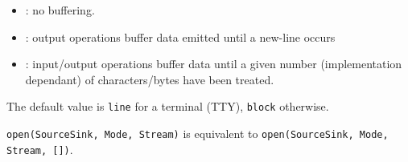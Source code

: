\begin{itemize}
\begin{itemize}

\item {}: no buffering.

\item {}: output operations buffer data emitted until a new-line
occurs

\item {}: input/output operations buffer data until a given
number (implementation dependant) of characters/bytes have been treated.

\end{itemize}

The default value is \texttt{line} for a terminal (TTY), \texttt{block}
otherwise.

\end{itemize}

\texttt{open(SourceSink, Mode, Stream)} is equivalent to
\texttt{open(SourceSink, Mode, Stream, [])}.

